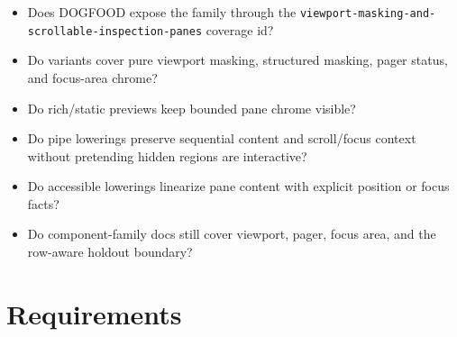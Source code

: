 \begin{itemize}
\tightlist
\item
  Does DOGFOOD expose the family through the \texttt{v\allowbreak{}i\allowbreak{}e\allowbreak{}w\allowbreak{}p\allowbreak{}o\allowbreak{}r\allowbreak{}t\allowbreak{}-\allowbreak{}m\allowbreak{}a\allowbreak{}s\allowbreak{}k\allowbreak{}i\allowbreak{}n\allowbreak{}g\allowbreak{}-\allowbreak{}a\allowbreak{}n\allowbreak{}d\allowbreak{}-\allowbreak{}s\allowbreak{}c\allowbreak{}r\allowbreak{}o\allowbreak{}l\allowbreak{}l\allowbreak{}a\allowbreak{}b\allowbreak{}l\allowbreak{}e\allowbreak{}-\allowbreak{}i\allowbreak{}n\allowbreak{}s\allowbreak{}p\allowbreak{}e\allowbreak{}c\allowbreak{}t\allowbreak{}i\allowbreak{}o\allowbreak{}n\allowbreak{}-\allowbreak{}p\allowbreak{}a\allowbreak{}n\allowbreak{}e\allowbreak{}s} coverage id?
\item
  Do variants cover pure viewport masking, structured masking, pager status, and focus-area chrome?
\item
  Do rich/static previews keep bounded pane chrome visible?
\item
  Do pipe lowerings preserve sequential content and scroll/focus context without pretending hidden regions are interactive?
\item
  Do accessible lowerings linearize pane content with explicit position or focus facts?
\item
  Do component-family docs still cover viewport, pager, focus area, and the row-aware holdout boundary?
\end{itemize}

\section{Requirements}\label{record-100-requirements}


